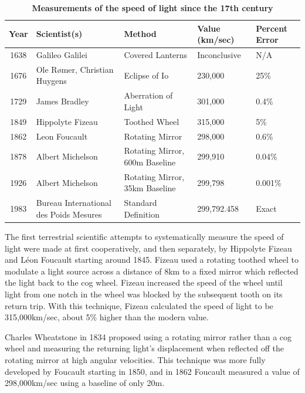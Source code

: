 \documentclass[twocolumn]{article}
\begin{document}
		\begin{table}[!ht]
			\centering
			\begin{tabular}{c|llll}
				Year & Scientist(s)                 	& Method				& Value (km/sec)      & Percent Error \\ \hline
				1638 & Galileo Galilei              	& Covered Lanterns		& Inconclusive 		  & N/A           \\
				1676 & Ole R\o{}mer, Christian Huygens 	& Eclipse of Io			& 230,000 			  & 25\%          \\
				1729 & James Bradley					& Aberration of Light	& 301,000			  & 0.4\%		\\
				1849 & Hippolyte Fizeau             	& Toothed Wheel			& 315,000 			  & 5\%           \\
				1862 & Leon Foucault                	& Rotating Mirror		& 298,000 			  & 0.6\%         \\
				1878 & Albert Michelson             	& Rotating Mirror, 600m Baseline	& 299,910 & 0.04\%        \\
				1926 & Albert Michelson            		& Rotating Mirror, 35km Baseline		 & 299,798 & 0.001\%  \\
				1983 & Bureau International des Poids Mesures	& Standard Definition	& 299,792.458	& Exact   
			\end{tabular}
			\caption{\textbf{Measurements of the speed of light since the 17th century}}
			\label{tab:HistoricalMasurements}
		\end{table}
		
		The first terrestrial scientific attempts to systematically measure the speed of light were made at first cooperatively, and then separately, by Hippolyte Fizeau and L\'{e}on Foucault starting around 1845.\cite{sanders_velocity_1965}
		Fizeau used a rotating toothed wheel to modulate a light source across a distance of 8km to a fixed mirror which reflected the light back to the cog wheel. 
		Fizeau increased the speed of the wheel until light from one notch in the wheel was blocked by the subsequent tooth on its return trip. With this technique, Fizeau calculated the speed of light to be 315,000km/sec, about 5\% higher than the modern value.\cite{sanders_velocity_1965}
		
		Charles Wheatstone in 1834 proposed using a rotating mirror rather than a cog wheel and measuring the returning light's displacement when reflected off the rotating mirror at high angular velocities. 
		This technique was more fully developed by Foucault starting in 1850, and in 1862 Foucault measured a value of 298,000km/sec using a baseline of only 20m.\cite{sanders_velocity_1965}
		
\end{document}
